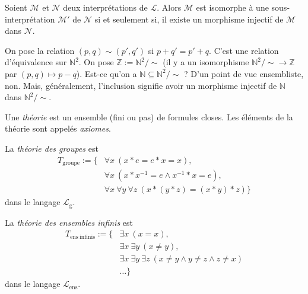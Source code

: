 \documentclass[./main]{subfiles}
\begin{document}
  \begin{prop}
    Soient $\mathcal{M}$ et $\mathcal{N}$ deux interprétations de $\mathcal{L}$. Alors $\mathcal{M}$ est isomorphe à une sous-interprétation $\mathcal{M}'$ de $\mathcal{N}$ si et seulement si, il existe un morphisme injectif de $\mathcal{M}$ dans $\mathcal{N}$.
  \end{prop}

  \begin{exm}
    On pose la relation $(p, q) \sim (p', q')$ si  $p + q' = p' + q$.
    C'est une relation d'équivalence sur  $\mathds{N}^2$.
    On pose $\mathds{Z} := \mathds{N}^2 / {\sim}$ (il y a un isomorphisme $\mathds{N}^2 / {\sim} \to \mathds{Z}$ par $(p,q) \mapsto p - q$).
    Est-ce qu'on a $\mathds{N} \subseteq \mathds{N}^2 / {\sim}$ ?
    D'un point de vue ensembliste, non.
    Mais, généralement, l'inclusion signifie avoir un morphisme injectif de $\mathds{N}$ dans $\mathds{N}^2 / {\sim}$.
  \end{exm}

  \begin{defn}
    Une \textit{théorie} est un ensemble (fini ou pas) de formules closes.
    Les éléments de la théorie sont appelés \textit{axiomes}.
  \end{defn}

  \begin{exm}
    La \textit{théorie des groupes} est
    \begin{align*}
      T_\mathrm{groupe} := \big\{
        &\forall x\: (x * e = e * x = x),\\
        &\forall x\: (x * x^{-1} = e \land x^{-1} * x = e),\\
        &\forall x\: \forall y\: \forall z\: (x * (y*z) = (x*y) *z)
      \big\} 
    \end{align*}
    dans le langage $\mathcal{L}_\mathrm{g}$.
  \end{exm}

  \begin{exm}
    La \textit{théorie des ensembles infinis} est 
    \begin{align*}
      T_\mathrm{ens\ infinis} := \big\{ &\exists x\: (x = x),\\
                               & \exists x\: \exists y\: (x \neq  y),\\
                               & \exists x \: \exists y \: \exists z\: (x \neq y \land y \neq z \land z \neq x)\\
                               &\ldots
      \big\}
    \end{align*}
    dans le langage $\mathcal{L}_\mathrm{ens}$.
  \end{exm}
\end{document}
